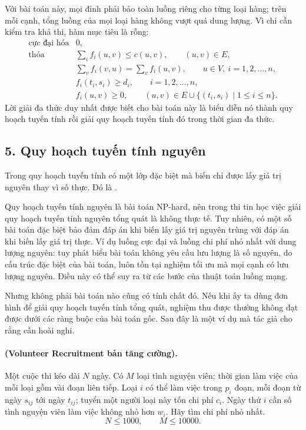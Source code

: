 \documentclass[11pt]{article}
\begin{document}
Với bài toán này, mọi đỉnh phải bảo toàn luồng riêng cho từng loại hàng; trên
mỗi cạnh, tổng luồng của mọi loại hàng không vượt quá dung lượng. Vì chỉ cần
kiểm tra khả thi, hàm mục tiêu là rỗng:
\[
\begin{array}{ll}
\text{cực đại hóa} & 0,\\
\text{thỏa} &
  \displaystyle \sum_i f_i(u,v)\le c(u,v),\qquad (u,v)\in E,\\
& \displaystyle \sum_v f_i(v,u)=\sum_v f_i(u,v),
  \qquad u\in V,\ i=1,2,\ldots,n,\\
& f_i(t_i,s_i)\ge d_i,\qquad i=1,2,\ldots,n,\\
& f_i(u,v)\ge 0,\qquad
  (u,v)\in E\cup\{(t_i,s_i)\mid 1\le i\le n\}.
\end{array}
\]
Lời giải đa thức duy nhất được biết cho bài toán này là biểu diễn nó thành
quy hoạch tuyến tính rồi giải quy hoạch tuyến tính đó trong thời gian đa
thức.

\subsection*{5. Quy hoạch tuyến tính nguyên}

Trong quy hoạch tuyến tính có một lớp đặc biệt mà biến chỉ được lấy giá trị
nguyên thay vì số thực. Đó là .

Quy hoạch tuyến tính nguyên là bài toán NP-hard, nên trong thi tin học việc
giải quy hoạch tuyến tính nguyên tổng quát là không thực tế. Tuy nhiên, có
một số bài toán đặc biệt bảo đảm đáp án khi biến lấy giá trị nguyên trùng với
đáp án khi biến lấy giá trị thực. Ví dụ luồng cực đại và luồng chi phí nhỏ
nhất với dung lượng nguyên: tuy phát biểu bài toán không yêu cầu lưu lượng là
số nguyên, do cấu trúc đặc biệt của bài toán, luôn tồn tại nghiệm tối ưu mà
mọi cạnh có lưu lượng nguyên. Điều này có thể suy ra từ các bước của thuật
toán luồng mạng.

Nhưng không phải bài toán nào cũng có tính chất đó. Nếu khi ấy ta dùng đơn
hình để giải quy hoạch tuyến tính tổng quát, nghiệm thu được thường không đạt
được dưới các ràng buộc của bài toán gốc. Sau đây là một ví dụ mà tác giả cho
rằng cần hoài nghi.

\paragraph{ (Volunteer Recruitment bản tăng cường).}
Một cuộc thi kéo dài \(N\) ngày. Có \(M\) loại tình nguyện viên; thời gian làm
việc của mỗi loại gồm vài đoạn liên tiếp. Loại \(i\) có thể làm việc trong
\(p_i\) đoạn, mỗi đoạn từ ngày \(s_{ij}\) tới ngày \(t_{ij}\); tuyển một
người loại này tốn chi phí \(c_i\). Ngày thứ \(i\) cần số tình nguyện viên làm
việc không nhỏ hơn \(w_i\). Hãy tìm chi phí nhỏ nhất.
\[
  N\le 1000,\qquad M\le 10000.
\]
\end{document}
